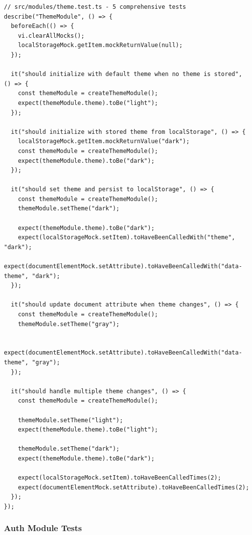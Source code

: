 \documentclass[11pt]{article}
\begin{document}
\begin{lstlisting}[style=typescript]
// src/modules/theme.test.ts - 5 comprehensive tests
describe("ThemeModule", () => {
  beforeEach(() => {
    vi.clearAllMocks();
    localStorageMock.getItem.mockReturnValue(null);
  });

  it("should initialize with default theme when no theme is stored", () => {
    const themeModule = createThemeModule();
    expect(themeModule.theme).toBe("light");
  });

  it("should initialize with stored theme from localStorage", () => {
    localStorageMock.getItem.mockReturnValue("dark");
    const themeModule = createThemeModule();
    expect(themeModule.theme).toBe("dark");
  });

  it("should set theme and persist to localStorage", () => {
    const themeModule = createThemeModule();
    themeModule.setTheme("dark");
    
    expect(themeModule.theme).toBe("dark");
    expect(localStorageMock.setItem).toHaveBeenCalledWith("theme", "dark");
    expect(documentElementMock.setAttribute).toHaveBeenCalledWith("data-theme", "dark");
  });

  it("should update document attribute when theme changes", () => {
    const themeModule = createThemeModule();
    themeModule.setTheme("gray");
    
    expect(documentElementMock.setAttribute).toHaveBeenCalledWith("data-theme", "gray");
  });

  it("should handle multiple theme changes", () => {
    const themeModule = createThemeModule();
    
    themeModule.setTheme("light");
    expect(themeModule.theme).toBe("light");
    
    themeModule.setTheme("dark");
    expect(themeModule.theme).toBe("dark");
    
    expect(localStorageMock.setItem).toHaveBeenCalledTimes(2);
    expect(documentElementMock.setAttribute).toHaveBeenCalledTimes(2);
  });
});
\end{lstlisting}

\subsubsection{Auth Module Tests}
\end{document}
